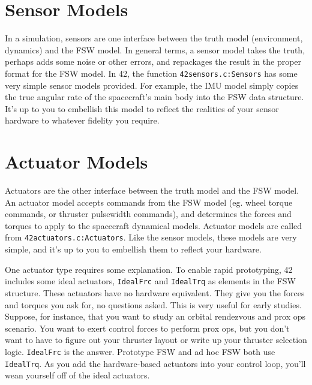 \documentclass[12pt]{article}
\begin{document}
\section{Sensor Models}

In a simulation, sensors are one interface between the truth model (environment, dynamics) and the FSW model.  In general terms, a sensor model takes the truth, perhaps adds some noise or other errors, and repackages the result in the proper format for the FSW model.  In 42, the function {\tt 42sensors.c:Sensors} has some very simple sensor models provided.  For example, the IMU model simply copies the true angular rate of the spacecraft's main body into the FSW data structure.  It's up to you to embellish this model to reflect the realities of your sensor hardware to whatever fidelity you require.

\section{Actuator Models}

Actuators are the other interface between the truth model and the FSW model.  An actuator model accepts commands from the FSW model (eg. wheel torque commands, or thruster pulsewidth commands), and determines the forces and torques to apply to the spacecraft dynamical models.  Actuator models are called from {\tt 42actuators.c:Actuators}.  Like the sensor models, these models are very simple, and it's up to you to embellish them to reflect your hardware.

One actuator type requires some explanation.  To enable rapid prototyping, 42 includes some ideal actuators, {\tt IdealFrc} and {\tt IdealTrq} as elements in the FSW structure.  These actuators have no hardware equivalent.  They give you the forces and torques you ask for, no questions asked.  This is very useful for early studies.  Suppose, for instance, that you want to study an orbital rendezvous and prox ops scenario.  You want to exert control forces to perform prox ops, but you don't want to have to figure out your thruster layout or write up your thruster selection logic.  {\tt IdealFrc} is the answer.  Prototype FSW and ad hoc FSW both use {\tt IdealTrq}.  As you add the hardware-based actuators into your control loop, you'll wean yourself off of the ideal actuators.
\end{document}
